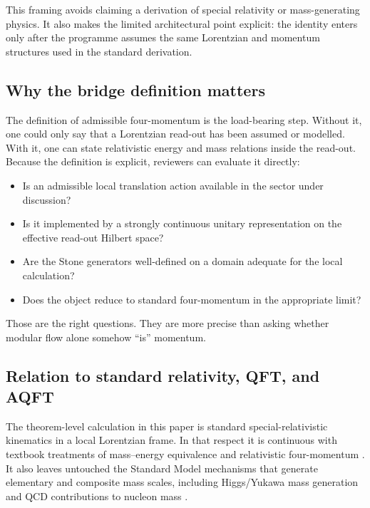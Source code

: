 \documentclass[12pt,a4paper]{article}
\theoremstyle{definition}
\theoremstyle{remark}
\newcommand{\tightlist}{%
  \setlength{\itemsep}{0pt}\setlength{\parskip}{0pt}}
\begin{document}
This framing avoids claiming a derivation of special relativity or mass-generating physics.  It also makes the limited architectural point explicit: the identity enters only after the programme assumes the same Lorentzian and momentum structures used in the standard derivation.

\subsection{Why the bridge definition matters}

The definition of admissible four-momentum is the load-bearing step. Without it, one could only say that a Lorentzian read-out has been assumed or modelled. With it, one can state relativistic energy and mass relations inside the read-out. Because the definition is explicit, reviewers can evaluate it directly:

\begin{itemize}[leftmargin=*]
\tightlist
\item Is an admissible local translation action available in the sector under discussion?
\item Is it implemented by a strongly continuous unitary representation on the effective read-out Hilbert space?
\item Are the Stone generators well-defined on a domain adequate for the local calculation?
\item Does the object reduce to standard four-momentum in the appropriate limit?
\end{itemize}

Those are the right questions. They are more precise than asking whether modular flow alone somehow ``is'' momentum.

\subsection{Relation to standard relativity, QFT, and AQFT}
\label{sec:mainstream-relation}

The theorem-level calculation in this paper is standard special-relativistic kinematics in a local Lorentzian frame. In that respect it is continuous with textbook treatments of mass--energy equivalence and relativistic four-momentum \cite{Einstein1905,Rindler2006,Wald1984}. It also leaves untouched the Standard Model mechanisms that generate elementary and composite mass scales, including Higgs/Yukawa mass generation and QCD contributions to nucleon mass \cite{PeskinSchroeder1995,WeinbergQFT2,Ji1995,Durr2008}.
\end{document}
